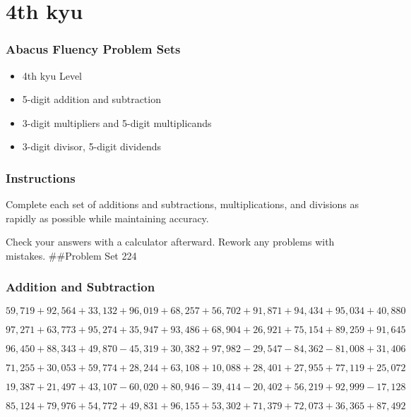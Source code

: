 \hypertarget{th-kyu}{%
\section{4th kyu}\label{th-kyu}}

\hypertarget{abacus-fluency-problem-sets}{%
\subsubsection{Abacus Fluency Problem
Sets}\label{abacus-fluency-problem-sets}}

\begin{itemize}
\item
  4th kyu Level
\item
  5-digit addition and subtraction
\item
  3-digit multipliers and 5-digit multiplicands
\item
  3-digit divisor, 5-digit dividends
\end{itemize}

\hypertarget{instructions}{%
\subsubsection{Instructions}\label{instructions}}

Complete each set of additions and subtractions, multiplications, and
divisions as rapidly as possible while maintaining accuracy.

Check your answers with a calculator afterward. Rework any problems with
mistakes. \#\#Problem Set 224

\hypertarget{addition-and-subtraction-1}{%
\subsubsection{Addition and
Subtraction}\label{addition-and-subtraction-1}}

\(59,719+92,564+33,132+96,019+68,257+56,702+91,871+94,434+95,034+40,880\)

\(97,271+63,773+95,274+35,947+93,486+68,904+26,921+75,154+89,259+91,645\)

\(96,450+88,343+49,870-45,319+30,382+97,982-29,547-84,362-81,008+31,406\)

\(71,255+30,053+59,774+28,244+63,108+10,088+28,401+27,955+77,119+25,072\)

\(19,387+21,497+43,107-60,020+80,946-39,414-20,402+56,219+92,999-17,128\)

\(85,124+79,976+54,772+49,831+96,155+53,302+71,379+72,073+36,365+87,492\)

